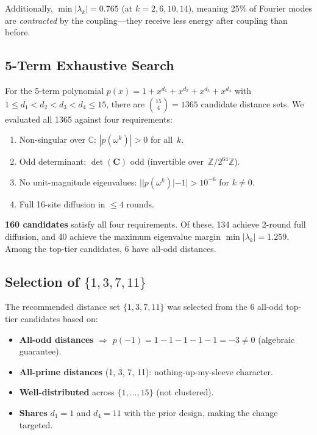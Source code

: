 \documentclass[runningheads]{llncs}
\newcommand{\Ztwo}{\mathbb{Z}/2^{64}\mathbb{Z}}
\newcommand{\coupmat}{\mathbf{C}}
\begin{document}
Additionally, $\min|\lambda_k| = 0.765$ (at $k = 2, 6, 10, 14$), meaning
25\% of Fourier modes are \emph{contracted} by the coupling---they receive
less energy after coupling than before.

\subsection{5-Term Exhaustive Search}

For the 5-term polynomial $p(x) = 1 + x^{d_1} + x^{d_2} + x^{d_3} + x^{d_4}$
with $1 \leq d_1 < d_2 < d_3 < d_4 \leq 15$, there are $\binom{15}{4} = 1365$
candidate distance sets.  We evaluated all 1365 against four requirements:

\begin{enumerate}[nosep,label=R\arabic*.]
\item Non-singular over $\mathbb{C}$: $|p(\omega^k)| > 0$ for all~$k$.
\item Odd determinant: $\det(\coupmat)$ odd (invertible over~$\Ztwo$).
\item No unit-magnitude eigenvalues: $||p(\omega^k)| - 1| > 10^{-6}$ for $k \neq 0$.
\item Full 16-site diffusion in $\leq 4$ rounds.
\end{enumerate}

\textbf{160 candidates} satisfy all four requirements.  Of these, 134 achieve
2-round full diffusion, and 40 achieve the maximum eigenvalue margin
$\min|\lambda_k| = 1.259$.  Among the top-tier candidates, 6 have all-odd
distances.

\subsection{Selection of \texorpdfstring{$\{1,3,7,11\}$}{1,3,7,11}}

The recommended distance set $\{1,3,7,11\}$ was selected from the 6 all-odd
top-tier candidates based on:
\begin{itemize}[nosep]
\item \textbf{All-odd distances} $\Rightarrow$ $p(-1) = 1-1-1-1-1 = -3 \neq 0$
  (algebraic guarantee).
\item \textbf{All-prime distances} (1, 3, 7, 11): nothing-up-my-sleeve character.
\item \textbf{Well-distributed} across $\{1, \ldots, 15\}$ (not clustered).
\item \textbf{Shares} $d_1 = 1$ and $d_4 = 11$ with the prior design, making the
  change targeted.
\end{itemize}
\end{document}
